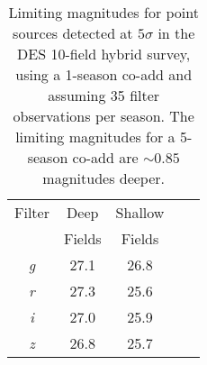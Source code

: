 \documentclass[preprint2]{aastex}    %
\begin{document}
\begin{table}[h]
\begin{center}
\begin{tabular}{ccccc}
\hline
Filter & Deep & Shallow\\
       & Fields  & Fields\\\hline
\textit{g} & 27.1 & 26.8\\
\textit{r} & 27.3 & 25.6\\
\textit{i} & 27.0 & 25.9\\
\textit{z} & 26.8 & 25.7\\
\hline
\end{tabular}
\caption{Limiting magnitudes for point sources detected at $5\sigma$ in the DES 
10-field hybrid survey, using a 1-season co-add and assuming 35 filter 
observations per season. The limiting magnitudes 
for a 5-season co-add are $\sim 0.85$ magnitudes deeper.\label{tab:limmag}}
\end{center}
\end{table}
\end{document}
